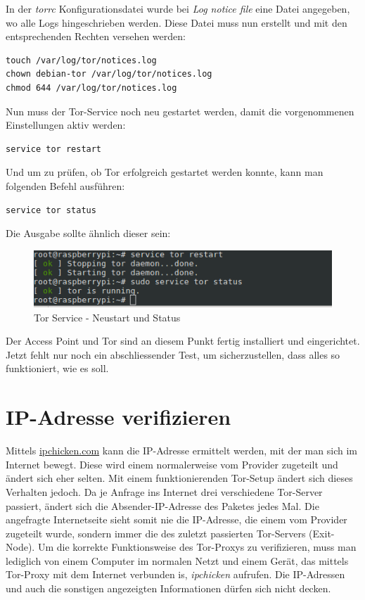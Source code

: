 In der \textit{torrc} Konfigurationsdatei wurde bei \textit{Log notice file} eine Datei angegeben, wo alle Logs hingeschrieben werden. Diese Datei muss nun erstellt und mit den entsprechenden Rechten versehen werden:

\begin{lstlisting}
touch /var/log/tor/notices.log
chown debian-tor /var/log/tor/notices.log
chmod 644 /var/log/tor/notices.log
\end{lstlisting}

Nun muss der Tor-Service noch neu gestartet werden, damit die vorgenommenen Einstellungen aktiv werden:

\begin{lstlisting}
service tor restart
\end{lstlisting}

Und um zu prüfen, ob Tor erfolgreich gestartet werden konnte, kann man folgenden Befehl ausführen:

\begin{lstlisting}
service tor status
\end{lstlisting}

Die Ausgabe sollte ähnlich dieser sein:

\begin{figure}[h]
\centering
\includegraphics[scale=0.7]{images/tor_service}
\caption{Tor Service - Neustart und Status}
\end{figure}

Der Access Point und Tor sind an diesem Punkt fertig installiert und eingerichtet. Jetzt fehlt nur noch ein abschliessender Test, um sicherzustellen, dass alles so funktioniert, wie es soll.

\section{IP-Adresse verifizieren}
Mittels \url{ipchicken.com} kann die IP-Adresse ermittelt werden, mit der man sich im Internet bewegt. Diese wird einem normalerweise vom Provider zugeteilt und ändert sich eher selten. Mit einem funktionierenden Tor-Setup ändert sich dieses Verhalten jedoch. Da je Anfrage ins Internet drei verschiedene Tor-Server passiert, ändert sich die Absender-IP-Adresse des Paketes jedes Mal. Die angefragte Internetseite sieht somit nie die IP-Adresse, die einem vom Provider zugeteilt wurde, sondern immer die des zuletzt passierten Tor-Servers (Exit-Node). Um die korrekte Funktionsweise des Tor-Proxys zu verifizieren, muss man lediglich von einem Computer im normalen Netzt und einem Gerät, das mittels Tor-Proxy mit dem Internet verbunden is, \textit{ipchicken} aufrufen. Die IP-Adressen und auch die sonstigen angezeigten Informationen dürfen sich nicht decken. 
